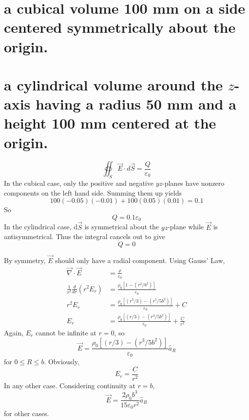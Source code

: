 \documentclass[answers]{exam}
\begin{document}
\begin{questions}

\begin{parts}
	\part{a cubical volume 100 mm on a side centered symmetrically about the origin.}
	\part{a cylindrical volume around the $z$-axis having a radius 50 mm and a height 100 mm centered at the origin.}
\end{parts}

\begin{solution}
	$$\oiint_S \vec{E}\cdot d\vec{S} = \frac{Q}{\varepsilon_0}$$
	In the cubical case, only the positive and negative $yz$-planes have nonzero components on the left hand side. Summing them up yields
	$$100(-0.05)(-0.01) + 100(0.05)(0.01) = 0.1$$
	So
	$$Q=0.1\varepsilon_0$$
	In the cylindrical case, d$\vec{S}$ is symmetrical about the $yz$-plane while $\vec{E}$ is antisymmetrical. Thus the integral cancels out to give
	$$Q=0$$
\end{solution}


\begin{solution}
	By symmetry, $\vec{E}$ should only have a radial component. Using Gauss' Law,
	\begin{align*}
		\vec{\nabla}\cdot\vec{E} &= \frac{\rho}{\varepsilon_0} \\
		\frac{1}{r^2}\frac{d}{dr}\left(r^2E_r\right) &= \frac{\rho_0[1-(r^2/b^2)]}{\varepsilon_0} \\
		r^2E_r &= \frac{\rho_0[(r^3/3)-(r^5/5b^2)]}{\varepsilon_0} + C \\
		E_r &= \frac{\rho_0[(r/3)-(r^3/5b^2)]}{\varepsilon_0} + \frac{C}{r^2}
	\end{align*}
	Again, $E_r$ cannot be infinite at $r=0$, so
	$$\vec{E} = \frac{\rho_0[(r/3)-(r^3/5b^2)]}{\varepsilon_0}\hat{a}_R$$
	for $0\leq R\leq b$. Obviously,
	$$E_r = \frac{C}{r^2}$$
	In any other case. Considering continuity at $r=b$,
	$$\vec{E} = \frac{2\rho_0b^3}{15\varepsilon_0r^2}\hat{a}_R$$
	for other cases.
\end{solution}


\end{questions}
\end{document}
